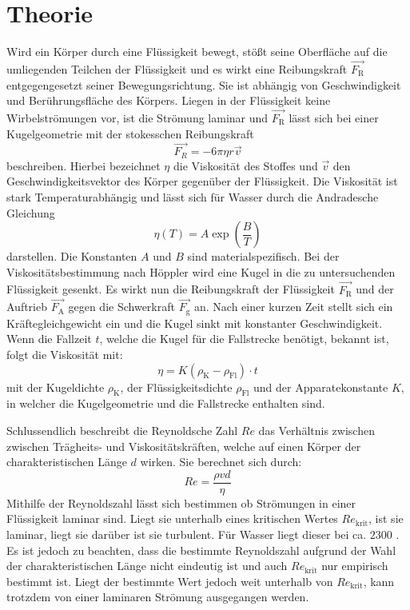 
\section{Theorie}
\label{sec:Theorie}
Wird ein Körper durch eine Flüssigkeit bewegt, stößt seine Oberfläche auf die
umliegenden Teilchen der Flüssigkeit und es wirkt eine Reibungskraft $\vec{F_\text{R}}$ entgegengesetzt
seiner Bewegungsrichtung.
 Sie ist abhängig von
Geschwindigkeit und Berührungsfläche des Körpers. Liegen in der Flüssigkeit
keine Wirbelströmungen vor, ist die Strömung laminar und $\vec{F_\text{R}}$ lässt sich
bei einer Kugelgeometrie mit der stokesschen Reibungskraft
\begin{equation}
  \vec{F_R} = -6 \pi \eta r \vec{v}\label{stokeR}
  \end{equation}
  beschreiben. Hierbei bezeichnet $\eta$ die Viskosität des Stoffes und $\vec{v}$ den Geschwindigkeitsvektor des Körper gegenüber der Flüssigkeit. Die Viskosität ist
  stark Temperaturabhängig und lässt sich für Wasser durch die Andradesche
  Gleichung
  \begin{equation}
    \eta(T) = A \exp\left(\frac{B}{T}\right)\label{andra}
    \end{equation}
darstellen. Die Konstanten $A$ und $B$ sind materialspezifisch.
Bei der Viskositätsbestimmung nach Höppler wird eine Kugel in die zu untersuchenden
Flüssigkeit gesenkt. Es wirkt nun die Reibungskraft der Flüssigkeit $\vec{F_\text{R}}$ und der Auftrieb $\vec{F_\text{A}}$ gegen die
Schwerkraft $\vec{F_\text{g}}$ an. Nach einer kurzen Zeit stellt sich ein Kräftegleichgewicht ein und
 die Kugel sinkt mit konstanter Geschwindigkeit. Wenn die Fallzeit $t$, welche
  die Kugel für die Fallstrecke benötigt, bekannt ist, folgt die Viskosität mit:
  \begin{equation}
    \eta = K(\rho_\text{K} - \rho_\text{Fl})\cdot t\label{visko}
    \end{equation}
mit der Kugeldichte $\rho_\text{K}$, der Flüssigkeitsdichte $\rho_\text{Fl}$ und der
Apparatekonstante $K$, in welcher die Kugelgeometrie und die Fallstrecke enthalten sind.

Schlussendlich beschreibt die Reynoldsche Zahl $Re$ das Verhältnis zwischen
zwischen Trägheits- und Viskositätskräften, welche auf einen Körper der
charakteristischen Länge $d$ wirken. Sie berechnet sich durch:
\begin{equation}
  Re = \frac{\rho v d}{\eta}\label{Re}
  \end{equation}
  Mithilfe der Reynoldszahl lässt sich bestimmen ob Strömungen in einer
  Flüssigkeit laminar sind. Liegt sie unterhalb eines kritischen Wertes $Re_\text{krit}$, ist
  sie laminar, liegt sie darüber ist sie turbulent. Für Wasser liegt dieser bei ca. $2300$ \cite{Rekrit}.
Es ist jedoch zu beachten, dass die bestimmte Reynoldszahl aufgrund der Wahl der charakteristischen Länge nicht eindeutig ist und auch
$Re_\text{krit}$ nur empirisch bestimmt ist. Liegt der bestimmte Wert jedoch weit unterhalb
 von $Re_\text{krit}$, kann trotzdem von einer laminaren Strömung ausgegangen werden.
